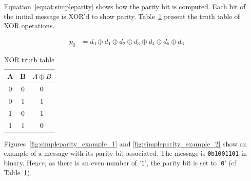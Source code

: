 Equation~\ref{equat:simpleparity} shows how the parity bit is computed. Each bit of the initial message is XOR'd to show parity. Table~\ref{tab:xor_truthtable} present the truth table of XOR operations.

\begin{equation} \label{equat:simpleparity}
    \begin{split}
        p_{0} &= d_{0} \oplus d_{1} \oplus d_{2} \oplus d_{3} \oplus d_{4} \oplus d_{5} \oplus d_{6}
    \end{split}
\end{equation}

\begin{table}[t]
    \centering
    \footnotesize
    \caption{XOR truth table}
    \label{tab:xor_truthtable}
    \begin{tabular}{@{}c|c|c@{}}
        \toprule
        A & B & $A \oplus B$ \\\midrule
        0 & 0 & 0            \\
        0 & 1 & 1            \\
        1 & 0 & 1            \\
        1 & 1 & 0            \\
        \bottomrule
    \end{tabular}
\end{table}

Figures~\ref{fig:simpleparity_example_1} and \ref{fig:simpleparity_example_2} show an example of a message with its parity bit associated. The message is \texttt{0b1001101} in binary. Hence, as there is an even number of '\texttt{1}', the parity bit is set to '\texttt{0}' (cf Table~\ref{tab:xor_truthtable}).

